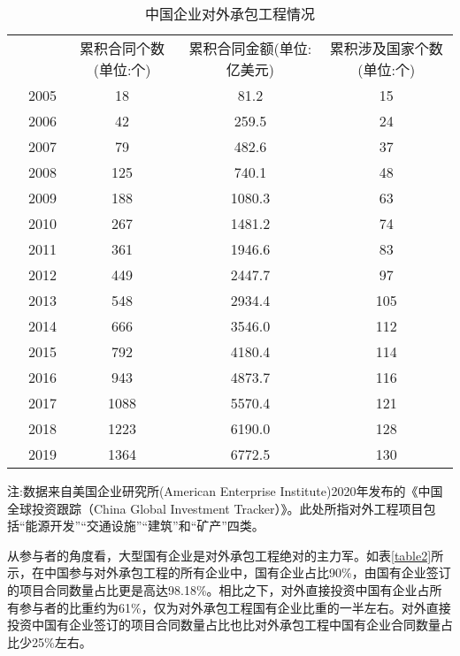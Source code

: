 \documentclass[a4paper,12pt]{article}
\begin{document}
\begin{table} [ht] \footnotesize
	\centering
	\captionsetup{labelformat=default,labelsep=period}
	\caption{中国企业对外承包工程情况}\label{table1}
	\begin{tabular}{lcccc}
		\toprule
			\vspace{0.2em}
	 &&  累积合同个数(单位:个)     & 累积合同金额(单位:亿美元) & 累积涉及国家个数(单位:个) \\
		\cline{1-5} 
		
	   &2005&	18&	81.2&	15 \\
	   &2006&42	&259.5&	24 \\
	   &2007&	79&	482.6&	37 \\
	   &2008&	125&	740.1&	48 \\ 
	   &2009&	188&	1080.3&	63 \\
	   &2010&	267&	1481.2&	74 \\
	   &2011&	361&	1946.6&	83 \\
	   &2012&	449&	2447.7&	97 \\ 
	   &2013&	548&	2934.4&	105 \\ 
	   &2014&	666&	3546.0&	112 \\
	   &2015&	792&	4180.4&	114 \\
	   &2016&	943&	4873.7&	116 \\
	   &2017&	1088&	5570.4&	121 \\
	   &2018&	1223&	6190.0&	128 \\
	   &2019&	1364&	6772.5&	130 \\		
		\bottomrule
	\end{tabular}
	\begin{minipage}{14cm}%
		\scriptsize\vspace{0.5em}
		注:数据来自美国企业研究所(American Enterprise Institute)2020年发布的《中国全球投资跟踪（China Global Investment Tracker）》。此处所指对外工程项目包括“能源开发”“交通设施”“建筑”和“矿产”四类。
	\end{minipage}%
\end{table}

	\vspace{0.5em}  %

从参与者的角度看，大型国有企业是对外承包工程绝对的主力军。如表\ref{table2}所示，在中国参与对外承包工程的所有企业中，国有企业占比90\%，由国有企业签订的项目合同数量占比更是高达98.18\%。相比之下，对外直接投资中国有企业占所有参与者的比重约为61\%，仅为对外承包工程国有企业比重的一半左右。对外直接投资中国有企业签订的项目合同数量占比也比对外承包工程中国有企业合同数量占比少25\%左右。
\end{document}
